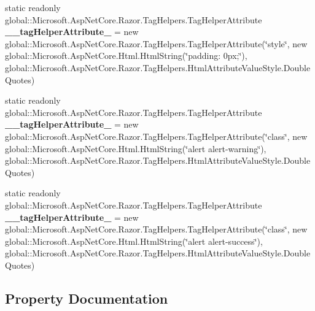 \begin{DoxyCompactItemize}
\item 
\mbox{\label{class_asp_net_core_1_1_views___home___index_aa3fa8c33ed3d9a81b201a308116f81e2}} 
static readonly global\+::\+Microsoft.\+Asp\+Net\+Core.\+Razor.\+Tag\+Helpers.\+Tag\+Helper\+Attribute {\bfseries \+\_\+\+\_\+tag\+Helper\+Attribute\+\_} = new global\+::\+Microsoft.\+Asp\+Net\+Core.\+Razor.\+Tag\+Helpers.\+Tag\+Helper\+Attribute(\char`\"{}style\char`\"{}, new global\+::\+Microsoft.\+Asp\+Net\+Core.\+Html.\+Html\+String(\char`\"{}padding\+: 0px;\char`\"{}), global\+::\+Microsoft.\+Asp\+Net\+Core.\+Razor.\+Tag\+Helpers.\+Html\+Attribute\+Value\+Style.\+Double\+Quotes)
\item 
\mbox{\label{class_asp_net_core_1_1_views___home___index_a8c2b21f5c04f2c2d4662ebeaea52f4e4}} 
static readonly global\+::\+Microsoft.\+Asp\+Net\+Core.\+Razor.\+Tag\+Helpers.\+Tag\+Helper\+Attribute {\bfseries \+\_\+\+\_\+tag\+Helper\+Attribute\+\_} = new global\+::\+Microsoft.\+Asp\+Net\+Core.\+Razor.\+Tag\+Helpers.\+Tag\+Helper\+Attribute(\char`\"{}class\char`\"{}, new global\+::\+Microsoft.\+Asp\+Net\+Core.\+Html.\+Html\+String(\char`\"{}alert alert-\/warning\char`\"{}), global\+::\+Microsoft.\+Asp\+Net\+Core.\+Razor.\+Tag\+Helpers.\+Html\+Attribute\+Value\+Style.\+Double\+Quotes)
\item 
\mbox{\label{class_asp_net_core_1_1_views___home___index_ac0aae32655a4a531ae79674eb29a23aa}} 
static readonly global\+::\+Microsoft.\+Asp\+Net\+Core.\+Razor.\+Tag\+Helpers.\+Tag\+Helper\+Attribute {\bfseries \+\_\+\+\_\+tag\+Helper\+Attribute\+\_} = new global\+::\+Microsoft.\+Asp\+Net\+Core.\+Razor.\+Tag\+Helpers.\+Tag\+Helper\+Attribute(\char`\"{}class\char`\"{}, new global\+::\+Microsoft.\+Asp\+Net\+Core.\+Html.\+Html\+String(\char`\"{}alert alert-\/success\char`\"{}), global\+::\+Microsoft.\+Asp\+Net\+Core.\+Razor.\+Tag\+Helpers.\+Html\+Attribute\+Value\+Style.\+Double\+Quotes)
\end{DoxyCompactItemize}


\subsection{Property Documentation}
\mbox{\label{class_asp_net_core_1_1_views___home___index_a65d1290cdf16f7790da6f85384c4602d}} 

